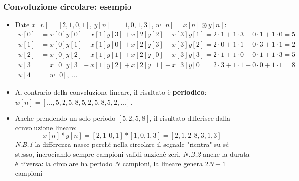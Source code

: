 \documentclass[12pt, a4paper]{article}
\begin{document}
\subsubsection{Convoluzione circolare: esempio}
\begin{itemize}
    \item Date $x[n]=[2,1,0,1]$, $y[n]=[1,0,1,3]$, $w[n]=x[n]\circledast y[n]$:
    \begin{align*}
        w[0] &= x[0]y[0]+x[1]y[3]+x[2]y[2]+x[3]y[1] = 2\cdot1+1\cdot3+0\cdot1+1\cdot0=5 \\
        w[1] &= x[0]y[1]+x[1]y[0]+x[2]y[3]+x[3]y[2] = 2\cdot0+1\cdot1+0\cdot3+1\cdot1=2 \\
        w[2] &= x[0]y[2]+x[1]y[1]+x[2]y[0]+x[3]y[3] = 2\cdot1+1\cdot0+0\cdot1+1\cdot3=5 \\
        w[3] &= x[0]y[3]+x[1]y[2]+x[2]y[1]+x[3]y[0] = 2\cdot3+1\cdot1+0\cdot0+1\cdot1=8 \\
        w[4] &= w[0],\ \dots
    \end{align*}
    \item Al contrario della convoluzione lineare, il risultato è \textbf{periodico}: $w[n]=[\dots,5,2,5,8,5,2,5,8,5,2,\dots]$.
    \item Anche prendendo un solo periodo $[5,2,5,8]$, il risultato differisce dalla convoluzione lineare:
    $$x[n]*y[n] = [2,1,0,1]*[1,0,1,3] = [2,1,2,8,3,1,3]$$
    \textit{N.B.1} la differenza nasce perché nella circolare il segnale "rientra" su sé stesso, incrociando sempre campioni validi anziché zeri. \textit{N.B.2} anche la durata è diversa: la circolare ha periodo $N$ campioni, la lineare genera $2N-1$ campioni.
\end{itemize}
\end{document}
